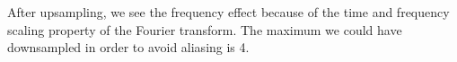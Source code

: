 \documentclass{article}
\begin{document}
\begin{center}
\end{center}
\begin{center}
\end{center}
After upsampling, we see the frequency effect because of the time and frequency scaling property of the Fourier transform. The maximum we could have downsampled in order to avoid aliasing is 4.
\clearpage
\end{document}

